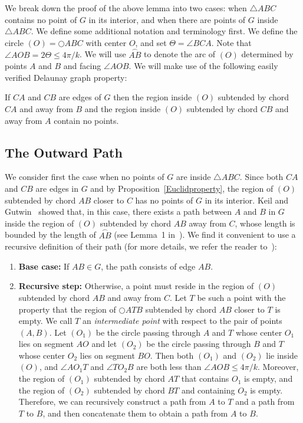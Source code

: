 \documentclass{stacs_proc}
\theoremstyle{plain}\newtheorem{satz}[thm]{Satz}
\begin{document}
We break down the proof of the above lemma into two cases: when
$\triangle{ABC}$ contains no point of $G$ in its interior, and when there
 are points of $G$ inside $\triangle{ABC}$. We define some additional notation
and terminology first. We define the circle $(O) = \bigcirc{ABC}$ with center
$O$, and set $\Theta = \angle{BCA}$. Note that $\angle{AOB} =2\Theta \leq
4\pi/k$. We will use $\stackrel{\frown}{AB}$ to denote the arc of $(O)$
determined by points $A$ and $B$ and facing $\angle{AOB}$. We will make use
of the following easily verified Delaunay graph property:
\begin{proposition}
\label{Euclidproperty} If $CA$ and $CB$ are edges of $G$ then the region inside $(O)$
subtended by chord $CA$ and away from $B$ and the region inside $(O)$ subtended
by chord $CB$ and away from $A$ contain no points.
\end{proposition}

\subsection{The Outward Path}
\label{outpath} We consider first the case when no points of $G$ are
inside $\triangle{ABC}$. Since both $CA$ and $CB$ are edges in $G$ and by
Proposition~\ref{Euclidproperty}, the region of $(O)$ subtended by chord $AB$
closer to $C$ has no points of $G$ in its interior. Keil and Gutwin~\cite{keil}
showed that, in this case, there exists a path between $A$ and $B$ in $G$
inside the region of $(O)$ subtended by chord $AB$ away from $C$, whose
length is bounded by the length of $\stackrel{\frown}{AB}$
(see Lemma~1 in~\cite{keil}). We find it convenient to use a recursive
definition of their path (for more details, we refer the reader
to~\cite{keil}):
\begin{enumerate}
\item {\bf Base case:} If $AB \in G$, the path consists of edge $AB$.

\item {\bf Recursive step:} Otherwise, a point must reside in the
region of $(O)$ subtended by chord $AB$ and away from $C$.
Let $T$ be such a point with the property that the region of
$\bigcirc{ATB}$ subtended by chord $AB$ closer to $T$ is empty.
We call $T$ an {\em intermediate point} with respect to the pair of
points $(A,B)$. Let $(O_1)$ be the circle passing through $A$ and
$T$ whose center $O_1$ lies on segment $AO$ and let $(O_2)$ be the
circle passing through $B$ and $T$ whose center $O_2$ lies on
segment $BO$. Then both $(O_1)$ and $(O_2)$ lie inside $(O)$, and
$\angle{AO_1T}$ and $\angle{TO_2B}$ are both less than $\angle{AOB}
\leq 4\pi/k$. Moreover, the region of $(O_1)$ subtended by chord
$AT$ that contains $O_1$ is empty, and the region of $(O_2)$
subtended by chord $BT$ and containing $O_2$ is empty. Therefore, we
can recursively construct a path from $A$ to $T$ and a path from $T$
to $B$, and then concatenate them to obtain a path from $A$ to $B$.
\end{enumerate}
\end{document}
